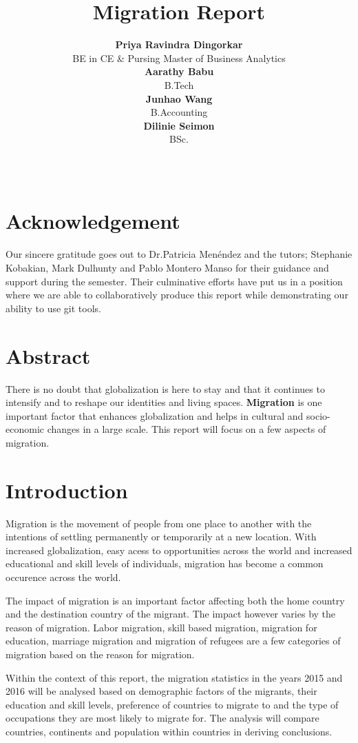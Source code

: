\documentclass[11pt,a4paper,]{article}
\title{Migration Report}
\author{\sf\Large\textbf{ Priya Ravindra Dingorkar}\\ {\sf\large BE in CE \& Pursing Master of Business Analytics\\[0.5cm]} \sf\Large\textbf{ Aarathy Babu}\\ {\sf\large B.Tech\\[0.5cm]} \sf\Large\textbf{ Junhao Wang}\\ {\sf\large B.Accounting\\[0.5cm]} \sf\Large\textbf{ Dilinie Seimon}\\ {\sf\large BSc.\\[0.5cm]}}
\date{\sf\Date~\Month~\Year}
\makeatletter
\def\titlepage{\front{\expandafter{\@title}}{\@author}{\@organization}}
\makeatother
\begin{document}
\titlepage

\section*{Acknowledgement}

Our sincere gratitude goes out to Dr.Patricia Menéndez and the tutors; Stephanie Kobakian, Mark Dulhunty and Pablo Montero Manso for their guidance and support during the semester. Their culminative efforts have put us in a position where we are able to collaboratively produce this report while demonstrating our ability to use git tools.

\section*{Abstract}

There is no doubt that globalization is here to stay and that it continues to intensify and to reshape our identities and living spaces. \textbf{Migration} is one important factor that enhances globalization and helps in cultural and socio-economic changes in a large scale. This report will focus on a few aspects of migration.

\section*{Introduction}

Migration is the movement of people from one place to another with the intentions of settling permanently or temporarily at a new location. With increased globalization, easy acess to opportunities across the world and increased educational and skill levels of individuals, migration has become a common occurence across the world.

The impact of migration is an important factor affecting both the home country and the destination country of the migrant. The impact however varies by the reason of migration. Labor migration, skill based migration, migration for education, marriage migration and migration of refugees are a few categories of migration based on the reason for migration.

Within the context of this report, the migration statistics in the years 2015 and 2016 will be analysed based on demographic factors of the migrants, their education and skill levels, preference of countries to migrate to and the type of occupations they are most likely to migrate for. The analysis will compare countries, continents and population within countries in deriving conclusions.
\end{document}
